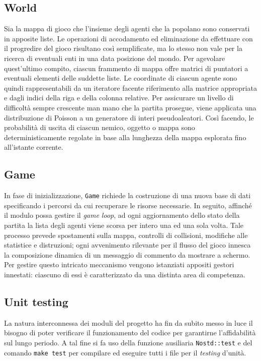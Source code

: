 \documentclass[a4paper]{article}
\begin{document}
\subsection{World}

Sia la mappa di gioco che l'insieme degli agenti che la popolano sono conservati
in apposite liste. Le operazioni di accodamento ed eliminazione da effettuare
con il progredire del gioco risultano cos\`i semplificate, ma lo stesso non vale
per la ricerca di eventuali enti in una data posizione del mondo. Per agevolare
quest'ultimo compito, ciascun frammento di mappa offre matrici di puntatori
a eventuali elementi delle suddette liste. Le coordinate di ciascun agente sono
quindi rappresentabili da un iteratore facente riferimento alla matrice
appropriata e dagli indici della riga e della colonna relative. Per assicurare
un livello di difficolt\`a sempre crescente man mano che la partita prosegue,
viene applicata una distribuzione di Poisson a un generatore di interi
pseudoaleatori. Cos\`i facendo, le probabilità di uscita di ciascun nemico,
oggetto o mappa sono deterministicamente regolate in base alla lunghezza della
mappa esplorata fino all'istante corrente.

\subsection{Game}

In fase di inizializzazione, \verb!Game! richiede la costruzione di una nuova
base di dati specificando i percorsi da cui recuperare le risorse necessarie.
In seguito, affinch\'e il modulo possa gestire il \emph{game loop}, ad ogni
aggiornamento dello stato della partita la lista degli agenti viene scorsa per
intero una ed una sola volta. Tale processo prevede spostamenti sulla mappa,
controlli di collisioni, modifiche alle statistice e distruzioni; ogni
avvenimento rilevante per il flusso del gioco innesca la composizione dinamica
di un messaggio di commento da mostrare a schermo. Per gestire questo intricato
meccanismo vengono istanziati appositi gestori innestati: ciascuno di essi \`e
caratterizzato da una distinta area di competenza.

\subsection{Unit testing}

La natura interconnessa dei moduli del progetto ha fin da subito messo in luce
il bisogno di poter verificare il funzionamento del codice per garantirne
l'affidabilit\`a sul lungo periodo. A tal fine si fa uso della funzione
ausiliaria \verb!Nostd::test! e del comando \verb!make test! per compilare ed
eseguire tutti i file per il \emph{testing} d'unit\`a.
\end{document}
